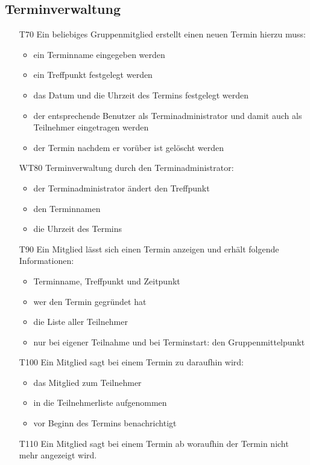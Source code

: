 \documentclass{scrartcl}
\begin{document}
	\subsection{Terminverwaltung}
	\begin{itemize}
		\item[T70] Ein beliebiges Gruppenmitglied erstellt einen neuen Termin hierzu muss:
			\begin{itemize}
			\item ein Terminname eingegeben werden
			\item ein Treffpunkt festgelegt werden
			\item das Datum und die Uhrzeit des Termins festgelegt werden
			\item der entsprechende Benutzer als Terminadministrator und damit auch als Teilnehmer eingetragen werden
			\item der Termin nachdem er vorüber ist gelöscht werden
			\end{itemize}
		\item[WT80] Terminverwaltung durch den Terminadministrator:
			\begin{itemize}
			\item der Terminadministrator ändert den Treffpunkt
			\item den Terminnamen
			\item die Uhrzeit des Termins
			\end{itemize}
		\item[T90] Ein Mitglied lässt sich einen Termin anzeigen und erhält folgende Informationen:
			\begin{itemize}
			\item Terminname, Treffpunkt und Zeitpunkt
			\item wer den Termin gegründet hat
			\item die Liste aller Teilnehmer
			\item nur bei eigener Teilnahme und bei Terminstart: den Gruppenmittelpunkt
			\end{itemize}
		\item[T100] Ein Mitglied sagt bei einem Termin zu daraufhin wird:
			\begin{itemize}
			\item das Mitglied zum Teilnehmer
			\item in die Teilnehmerliste aufgenommen
			\item vor Beginn des Termins benachrichtigt
			\end{itemize}
		\item[T110] Ein Mitglied sagt bei einem Termin ab woraufhin der Termin nicht mehr angezeigt wird. 
	\end{itemize}
\end{document}
